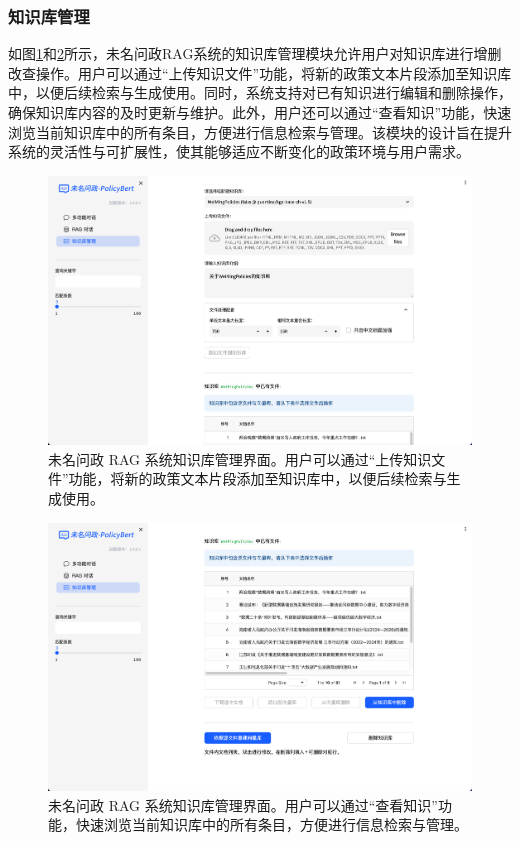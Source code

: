\documentclass[12pt, a4paper]{ctexart}
\begin{document}
\subsubsection{知识库管理}
如图\ref{fig:kb_manage_1}和\ref{fig:kb_manage_2}所示，未名问政RAG系统的知识库管理模块允许用户对知识库进行增删改查操作。用户可以通过“上传知识文件”功能，将新的政策文本片段添加至知识库中，以便后续检索与生成使用。同时，系统支持对已有知识进行编辑和删除操作，确保知识库内容的及时更新与维护。此外，用户还可以通过“查看知识”功能，快速浏览当前知识库中的所有条目，方便进行信息检索与管理。该模块的设计旨在提升系统的灵活性与可扩展性，使其能够适应不断变化的政策环境与用户需求。

\begin{figure}[H]
    \centering
    \includegraphics[width=1\textwidth]{./images/kb_manage_1.png}
    \caption{未名问政 RAG 系统知识库管理界面。用户可以通过“上传知识文件”功能，将新的政策文本片段添加至知识库中，以便后续检索与生成使用。}
    \label{fig:kb_manage_1}
\end{figure}

\begin{figure}[H]
    \centering
    \includegraphics[width=1\textwidth]{./images/kb_manage_2.png}
    \caption{未名问政 RAG 系统知识库管理界面。用户可以通过“查看知识”功能，快速浏览当前知识库中的所有条目，方便进行信息检索与管理。}
    \label{fig:kb_manage_2}
\end{figure}
\end{document}

